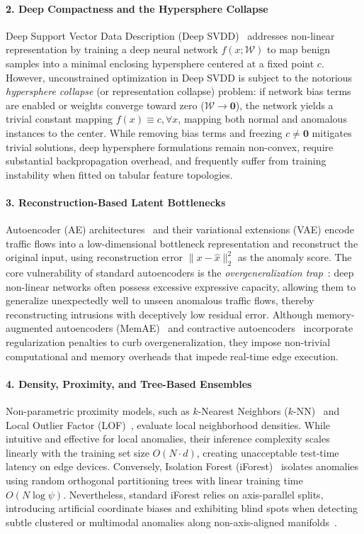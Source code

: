 \paragraph{2. Deep Compactness and the Hypersphere Collapse}
Deep Support Vector Data Description (Deep SVDD)~\cite{DeepSVDD} addresses non-linear representation by training a deep neural network $f(x; \mathcal{W})$ to map benign samples into a minimal enclosing hypersphere centered at a fixed point $c$. However, unconstrained optimization in Deep SVDD is subject to the notorious \emph{hypersphere collapse} (or representation collapse) problem: if network bias terms are enabled or weights converge toward zero ($\mathcal{W} \to \mathbf{0}$), the network yields a trivial constant mapping $f(x) \equiv c, \forall x$, mapping both normal and anomalous instances to the center. While removing bias terms and freezing $c \neq \mathbf{0}$ mitigates trivial solutions, deep hypersphere formulations remain non-convex, require substantial backpropagation overhead, and frequently suffer from training instability when fitted on tabular feature topologies.

\paragraph{3. Reconstruction-Based Latent Bottlenecks}
Autoencoder (AE) architectures~\cite{sakurada2014anomaly} and their variational extensions (VAE) encode traffic flows into a low-dimensional bottleneck representation and reconstruct the original input, using reconstruction error $\|x - \hat{x}\|_2^2$ as the anomaly score. The core vulnerability of standard autoencoders is the \emph{overgeneralization trap}~\cite{gong2019memorizing}: deep non-linear networks often possess excessive expressive capacity, allowing them to generalize unexpectedly well to unseen anomalous traffic flows, thereby reconstructing intrusions with deceptively low residual error. Although memory-augmented autoencoders (MemAE)~\cite{gong2019memorizing} and contractive autoencoders~\cite{aktar2024robust} incorporate regularization penalties to curb overgeneralization, they impose non-trivial computational and memory overheads that impede real-time edge execution.

\paragraph{4. Density, Proximity, and Tree-Based Ensembles}
Non-parametric proximity models, such as $k$-Nearest Neighbors ($k$-NN)~\cite{ramaswamy2000efficient} and Local Outlier Factor (LOF)~\cite{breunig2000lof}, evaluate local neighborhood densities. While intuitive and effective for local anomalies, their inference complexity scales linearly with the training set size $O(N \cdot d)$, creating unacceptable test-time latency on edge devices. Conversely, Isolation Forest (iForest)~\cite{liu2008isolation} isolates anomalies using random orthogonal partitioning trees with linear training time $O(N \log \psi)$. Nevertheless, standard iForest relies on axis-parallel splits, introducing artificial coordinate biases and exhibiting blind spots when detecting subtle clustered or multimodal anomalies along non-axis-aligned manifolds~\cite{hariri2021extended}.

